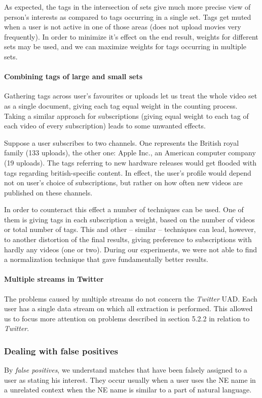 As expected, the tags in the intersection of sets give much more precise view of person's
interests as compared to tags occurring in a single set. Tags get muted when a user is not active in one of
those areas (\eg does not upload movies very frequently). In order to minimize it's effect on the
end result, weights for different sets may be used, and we can maximize weights for tags occurring
in multiple sets.

\paragraph{Combining tags of large and small sets}
Gathering tags across user's favourites or uploads let us treat the whole video
set as a single document, giving each tag equal weight in the counting process.
Taking a similar approach for subscriptions (\eg giving equal weight to each
tag of each video of every subscription) leads to some unwanted effects.

Suppose a user subscribes to two channels. One represents the British royal
family (133 uploads), the other one: Apple Inc., an American computer company
(19 uploads). The tags referring to new hardware releases would get flooded with
tags regarding british-specific content. In effect, the user's profile would
depend not on user's choice of subscriptions, but rather on how often new videos
are published on these channels.

In order to counteract this effect a number of techniques can be used. One of
them is giving tags in each subscription a weight, based on the number of videos or
total number of tags. This and other -- similar -- techniques can lead,
however, to another distortion of the final results, giving preference to
subscriptions with hardly any videos (one or two). During our experiments,
we were not able to find a normalization technique that gave
fundamentally better results.

\paragraph{Multiple streams in Twitter}
The problems caused by multiple streams do not concern the \textit{Twitter} UAD. Each user has a single
data stream on which all extraction is performed. This allowed us to focus more attention
on problems described in section 5.2.2 in relation to \textit{Twitter}.

\subsubsection{Dealing with false positives}
By \textit{false positives}, we understand matches that have been falsely
assigned to a user as stating his interest.
They occur usually when a user uses the NE name in a unrelated context when the NE name is similar to a
part of natural language.

